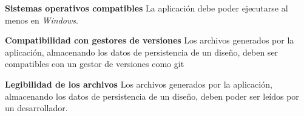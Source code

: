 \item \textbf{Sistemas operativos compatibles}\newline
	La aplicación debe poder ejecutarse al menos en \textit{Windows}.
\item \textbf{Compatibilidad con gestores de versiones}\newline
	Los archivos generados por la aplicación, almacenando los datos de persistencia de un diseño, deben ser compatibles con un gestor de versiones como git\cite{git}
\item \textbf{Legibilidad de los archivos}\newline
	Los archivos generados por la aplicación, almacenando los datos de persistencia de un diseño, deben poder ser leídos por un desarrollador.